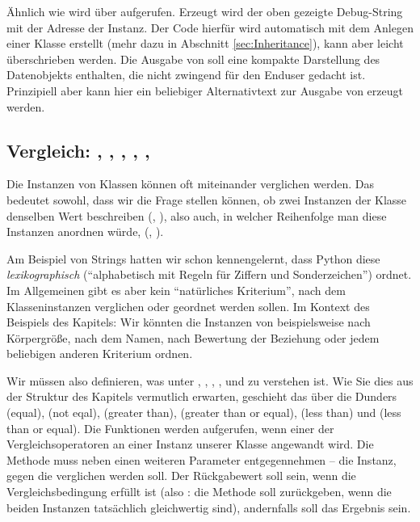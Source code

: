 Ähnlich wie  wird  über  aufgerufen. Erzeugt wird der oben gezeigte Debug-String mit der Adresse der Instanz. Der Code hierfür wird automatisch mit dem Anlegen einer Klasse erstellt (mehr dazu in Abschnitt \ref{sec:Inheritance}), kann aber leicht überschrieben werden. Die Ausgabe von  soll eine kompakte Darstellung des Datenobjekts enthalten, die nicht zwingend für den Enduser gedacht ist. Prinzipiell aber kann hier ein beliebiger Alternativtext zur Ausgabe von  erzeugt werden.

\subsection{Vergleich: , , , , , }
Die Instanzen von Klassen können oft miteinander verglichen werden. Das bedeutet sowohl, dass wir die Frage stellen können, ob zwei Instanzen der Klasse denselben Wert beschreiben (, \eg {}), also auch, in welcher Reihenfolge man diese Instanzen anordnen würde, (, \eg {}).

Am Beispiel von Strings hatten wir schon kennengelernt, dass Python diese \emph{lexikographisch} (\enquote{alphabetisch mit Regeln für Ziffern und Sonderzeichen}) ordnet. Im Allgemeinen gibt es aber kein \enquote{natürliches Kriterium}, nach dem Klasseninstanzen verglichen oder geordnet werden sollen. Im Kontext des Beispiels des Kapitels: Wir könnten die Instanzen von  beispielsweise nach Körpergröße, nach dem Namen, nach Bewertung der Beziehung oder jedem beliebigen anderen Kriterium ordnen.

Wir müssen also definieren, was unter , , , ,  und  zu verstehen ist. Wie Sie dies aus der Struktur des Kapitels vermutlich erwarten, geschieht das über die Dunders  (equal),  (not eqal),  (greater than),  (greater than or equal),  (less than) und  (less than or equal). Die Funktionen werden aufgerufen, wenn einer der Vergleichsoperatoren an einer Instanz unserer Klasse angewandt wird. Die Methode muss neben  einen weiteren Parameter entgegennehmen -- die Instanz, gegen die verglichen werden  soll. Der Rückgabewert soll  sein, wenn die Vergleichsbedingung erfüllt ist (also \eg: die Methode  soll  zurückgeben, wenn die beiden Instanzen tatsächlich gleichwertig sind), andernfalls soll das Ergebnis  sein.

